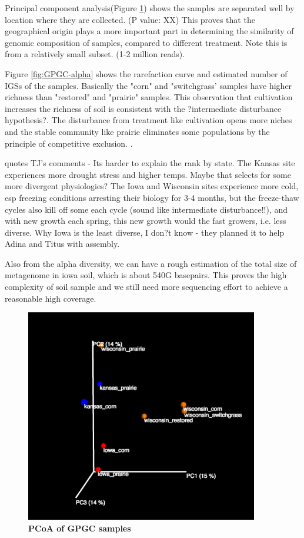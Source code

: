 \documentclass[12pt]{report}
\begin{document}
Principal component analysis(Figure \ref{fig:GPGC_beta}) shows the samples are separated well by location where they are collected. (P value: XX)
This proves that the geographical origin plays a more important part in determining the similarity of genomic composition of samples, compared to different treatment. Note this is from a relatively small subset. (1-2 million reads). 

Figure \ref{fig:GPGC-alpha} shows the rarefaction curve and estimated number of IGSs of the samples. Basically the "corn" and "switchgrass' samples
have higher richness than "restored" and "prairie" samples. This observation that cultivation increases the richness of soil 
is consistent with the ?intermediate disturbance hypothesis?. The disturbance from treatment like cultivation opens more niches and the stable 
community like prairie eliminates some populations by the principle of competitive exclusion. . 

quotes TJ's comments - Its harder to explain the rank by state.  The Kansas site experiences more drought stress and higher temps. Maybe that selects for some more divergent physiologies? The Iowa and Wisconsin sites experience more cold, esp freezing conditions arresting their biology for 3-4 months, but the freeze-thaw cycles also kill off some each cycle (sound like intermediate disturbance!!), and with new growth each spring, this new growth would the fast growers, i.e. less diverse. Why Iowa is the least diverse, I don?t know - they planned it to help Adina and Titus with assembly.

 Also from the alpha diversity, we can have a rough estimation of the  total size of metagenome in iowa soil, which is about 540G basepairs. This 
 proves the high complexity of soil sample and we still need more sequencing effort to achieve a reasonable high coverage.
 

\begin{figure}[!ht]
 \centerline{\includegraphics[width=4in]{./figures/GPGC_old_subset1M.png}}
\caption{\bf PCoA  of GPGC samples}
\label{fig:GPGC_beta}
\end{figure}
\end{document}
